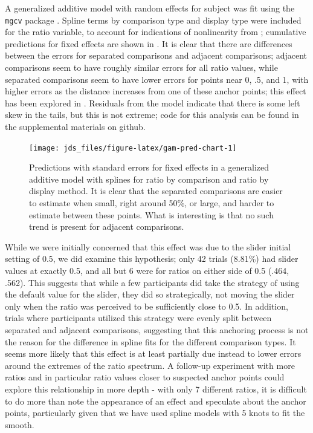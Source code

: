 \documentclass[letterpaper,inpress,dvipsnames]{jdsart}
\begin{document}
A generalized additive model with random effects for subject was fit using the \texttt{mgcv} package \citep{mgcv1, mgcv2, mgcv3}. Spline terms by comparison type and display type were included for the ratio variable, to account for indications of nonlinearity from ; cumulative predictions for fixed effects are shown in . It is clear that there are differences between the errors for separated comparisons and adjacent comparisons; adjacent comparisons seem to have roughly similar errors for all ratio values, while separated comparisons seem to have lower errors for points near 0, .5, and 1, with higher errors as the distance increases from one of these anchor points; this effect has been explored in \citet{hollandsBiasProportionJudgments2000}.
Residuals from the model indicate that there is some left skew in the tails, but this is not extreme; code for this analysis can be found in the supplemental materials on github.

\begin{figure}
\texttt{[image: jds\_files/figure-latex/gam-pred-chart-1]} \caption{Predictions with standard errors for fixed effects in a generalized additive model with splines for ratio by comparison and ratio by display method. It is clear that the separated comparisons are easier to estimate when small, right around 50\%, or large, and harder to estimate between these points. What is interesting is that no such trend is present for adjacent comparisons. }\label{fig:gam-pred-chart}
\end{figure}

While we were initially concerned that this effect was due to the slider initial setting of 0.5, we did examine this hypothesis; only 42 trials (8.81\%) had slider values at exactly 0.5, and all but 6 were for ratios on either side of 0.5 (.464, .562). This suggests that while a few participants did take the strategy of using the default value for the slider, they did so strategically, not moving the slider only when the ratio was perceived to be sufficiently close to 0.5. In addition, trials where participants utilized this strategy were evenly split between separated and adjacent comparisons, suggesting that this anchoring process is not the reason for the difference in spline fits for the different comparison types. It seems more likely that this effect is at least partially due instead to lower errors around the extremes of the ratio spectrum. A follow-up experiment with more ratios and in particular ratio values closer to suspected anchor points could explore this relationship in more depth - with only 7 different ratios, it is difficult to do more than note the appearance of an effect and speculate about the anchor points, particularly given that we have used spline models with 5 knots to fit the smooth.
\end{document}

